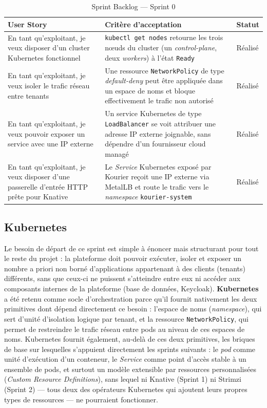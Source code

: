 \begin{table}[!ht]
\begin{center}
     \begin{tabular}{|l{6cm}|l{5.5cm}|l{2.5cm}|}
     \hline
     \textbf{User Story} & \textbf{Critère d'acceptation} & \textbf{Statut} \\
     \hline
     En tant qu'exploitant, je veux disposer d'un cluster Kubernetes fonctionnel & \texttt{kubectl get nodes} retourne les trois nœuds du cluster (un \textit{control-plane}, deux \textit{workers}) à l'état \texttt{Ready} & Réalisé \\
     \hline
     En tant qu'exploitant, je veux isoler le trafic réseau entre tenants & Une ressource \texttt{NetworkPolicy} de type \textit{default-deny} peut être appliquée dans un espace de noms et bloque effectivement le trafic non autorisé & Réalisé \\
     \hline
     En tant qu'exploitant, je veux pouvoir exposer un service avec une IP externe & Un service Kubernetes de type \texttt{LoadBalancer} se voit attribuer une adresse IP externe joignable, sans dépendre d'un fournisseur cloud managé & Réalisé \\
     \hline
     En tant qu'exploitant, je veux disposer d'une passerelle d'entrée HTTP prête pour Knative & Le \textit{Service} Kubernetes exposé par Kourier reçoit une IP externe via MetalLB et route le trafic vers le \textit{namespace} \texttt{kourier-system} & Réalisé \\
     \hline
     \end{tabular}
     \caption{Sprint Backlog — Sprint 0}
     \label{tab:sb-sprint0}
     \end{center}
\end{table}

\subsection{Kubernetes}

Le besoin de départ de ce sprint est simple à énoncer mais structurant pour tout le reste du projet : la plateforme doit pouvoir exécuter, isoler et exposer un nombre a priori non borné d'applications appartenant à des clients (tenants) différents, sans que ceux-ci ne puissent s'atteindre entre eux ni accéder aux composants internes de la plateforme (base de données, Keycloak). \textbf{Kubernetes}~\citep{KubernetesDoc} a été retenu comme socle d'orchestration parce qu'il fournit nativement les deux primitives dont dépend directement ce besoin : l'espace de noms (\textit{namespace}), qui sert d'unité d'isolation logique par tenant, et la ressource \texttt{NetworkPolicy}, qui permet de restreindre le trafic réseau entre pods au niveau de ces espaces de noms. Kubernetes fournit également, au-delà de ces deux primitives, les briques de base sur lesquelles s'appuient directement les sprints suivants : le \textit{pod} comme unité d'exécution d'un conteneur, le \textit{Service} comme point d'accès stable à un ensemble de pods, et surtout un modèle extensible par ressources personnalisées (\textit{Custom Resource Definitions}), sans lequel ni Knative (Sprint 1) ni Strimzi (Sprint 2) — tous deux des opérateurs Kubernetes qui ajoutent leurs propres types de ressources — ne pourraient fonctionner.

